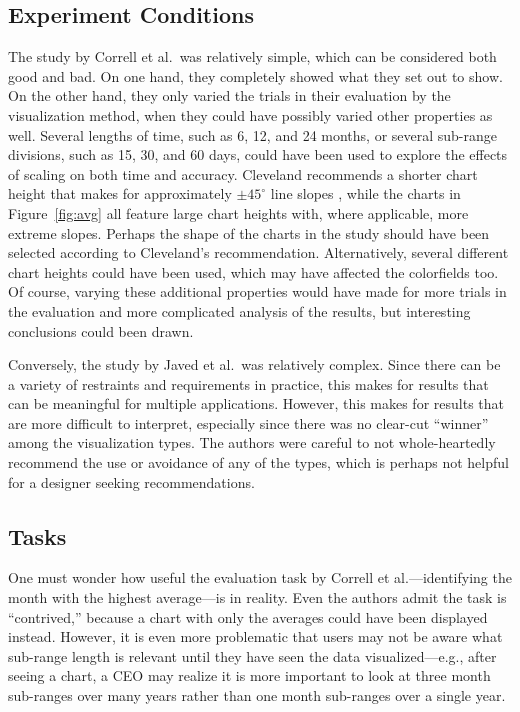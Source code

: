 \documentclass{article} %
\begin{document}
\subsection{Experiment Conditions}

The study by Correll et al.\ was relatively simple, which can be considered both good and bad.  On one hand, they completely showed what they set out to show.  On the other hand, they only varied the trials in their evaluation by the visualization method, when they could have possibly varied other properties as well.  Several lengths of time, such as 6, 12, and 24 months, or several sub-range divisions, such as 15, 30, and 60 days, could have been used to explore the effects of scaling on both time and accuracy.  Cleveland recommends a shorter chart height that makes for approximately $\pm 45 ^{\circ}$ line slopes \cite{cleveland1988}, while the charts in Figure~\ref{fig:avg} all feature large chart heights with, where applicable, more extreme slopes.  Perhaps the shape of the charts in the study should have been selected according to Cleveland's recommendation.  Alternatively, several different chart heights could have been used, which may have affected the colorfields too.  Of course, varying these additional properties would have made for more trials in the evaluation and more complicated analysis of the results, but interesting conclusions could been drawn.

Conversely, the study by Javed et al.\ was relatively complex.  Since there can be a variety of restraints and requirements in practice, this makes for results that can be meaningful for multiple applications.  However, this makes for results that are more difficult to interpret, especially since there was no clear-cut ``winner'' among the visualization types.  The authors were careful to not whole-heartedly recommend the use or avoidance of any of the types, which is perhaps not helpful for a designer seeking recommendations.  

\subsection{Tasks}

One must wonder how useful the evaluation task by Correll et al.---identifying the month with the highest average---is in reality.  Even the authors admit the task is ``contrived,'' because a chart with only the averages could have been displayed instead.  However, it is even more problematic that users may not be aware what sub-range length is relevant until they have seen the data visualized---e.g., after seeing a chart, a CEO may realize it is more important to look at three month sub-ranges over many years rather than one month sub-ranges over a single year.
\end{document}
